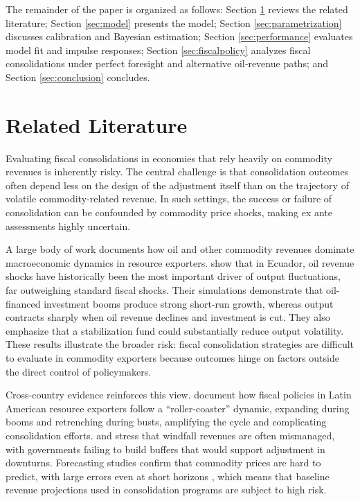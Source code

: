 \documentclass[12pt]{article}
\begin{document}
The remainder of the paper is organized as follows: Section \ref{sec:literature} reviews the related literature; Section \ref{sec:model} presents the model; Section \ref{sec:parametrization} discusses calibration and Bayesian estimation; Section \ref{sec:performance} evaluates model fit and impulse responses; Section \ref{sec:fiscalpolicy} analyzes fiscal consolidations under perfect foresight and alternative oil‑revenue paths; and Section \ref{sec:conclusion} concludes.


\section{Related Literature}\label{sec:literature}


Evaluating fiscal consolidations in economies that rely heavily on commodity revenues is inherently risky. The central challenge is that consolidation outcomes often depend less on the design of the adjustment itself than on the trajectory of volatile commodity-related revenue. In such settings, the success or failure of consolidation can be confounded by commodity price shocks, making ex ante assessments highly uncertain.

A large body of work documents how oil and other commodity revenues dominate macroeconomic dynamics in resource exporters. \citet{GarciaAlban2021} show that in Ecuador, oil revenue shocks have historically been the most important driver of output fluctuations, far outweighing standard fiscal shocks. Their simulations demonstrate that oil-financed investment booms produce strong short-run growth, whereas output contracts sharply when oil revenue declines and investment is cut. They also emphasize that a stabilization fund could substantially reduce output volatility. These results illustrate the broader risk: fiscal consolidation strategies are difficult to evaluate in commodity exporters because outcomes hinge on factors outside the direct control of policymakers.

Cross-country evidence reinforces this view. \citet{VillafuerteLopez-MurphyOssowski13} document how fiscal policies in Latin American resource exporters follow a ``roller-coaster'' dynamic, expanding during booms and retrenching during busts, amplifying the cycle and complicating consolidation efforts. \citet{vanPloegVenables2011} and \citet{Venables16} stress that windfall revenues are often mismanaged, with governments failing to build buffers that would support adjustment in downturns. Forecasting studies confirm that commodity prices are hard to predict, with large errors even at short horizons \citep[see][]{BaumeisterKilian2016}, which means that baseline revenue projections used in consolidation programs are subject to high risk.
\end{document}

